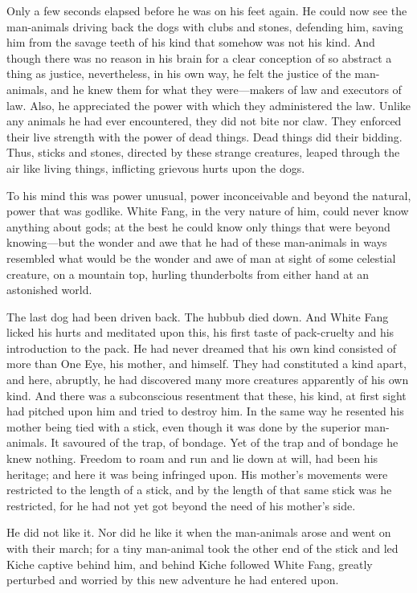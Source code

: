 \documentclass[10pt]{book}
\begin{document}
Only a few seconds elapsed before he was on his feet again. He could
now see the man-animals driving back the dogs with clubs and stones,
defending him, saving him from the savage teeth of his kind that
somehow was not his kind. And though there was no reason in his brain
for a clear conception of so abstract a thing as justice, nevertheless,
in his own way, he felt the justice of the man-animals, and he knew
them for what they were—makers of law and executors of law. Also, he
appreciated the power with which they administered the law. Unlike any
animals he had ever encountered, they did not bite nor claw. They
enforced their live strength with the power of dead things. Dead things
did their bidding. Thus, sticks and stones, directed by these strange
creatures, leaped through the air like living things, inflicting
grievous hurts upon the dogs.

To his mind this was power unusual, power inconceivable and beyond the
natural, power that was godlike. White Fang, in the very nature of him,
could never know anything about gods; at the best he could know only
things that were beyond knowing—but the wonder and awe that he had of
these man-animals in ways resembled what would be the wonder and awe of
man at sight of some celestial creature, on a mountain top, hurling
thunderbolts from either hand at an astonished world.

The last dog had been driven back. The hubbub died down. And White Fang
licked his hurts and meditated upon this, his first taste of
pack-cruelty and his introduction to the pack. He had never dreamed
that his own kind consisted of more than One Eye, his mother, and
himself. They had constituted a kind apart, and here, abruptly, he had
discovered many more creatures apparently of his own kind. And there
was a subconscious resentment that these, his kind, at first sight had
pitched upon him and tried to destroy him. In the same way he resented
his mother being tied with a stick, even though it was done by the
superior man-animals. It savoured of the trap, of bondage. Yet of the
trap and of bondage he knew nothing. Freedom to roam and run and lie
down at will, had been his heritage; and here it was being infringed
upon. His mother’s movements were restricted to the length of a stick,
and by the length of that same stick was he restricted, for he had not
yet got beyond the need of his mother’s side.

He did not like it. Nor did he like it when the man-animals arose and
went on with their march; for a tiny man-animal took the other end of
the stick and led Kiche captive behind him, and behind Kiche followed
White Fang, greatly perturbed and worried by this new adventure he had
entered upon.
\end{document}
